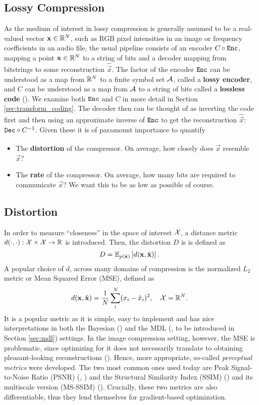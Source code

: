 \subsection{Lossy Compression}
As the medium of interest in lossy compression is generally assumed to be a
real-valued vector $\vec{x} \in \Reals^N$, such as RGB pixel intensities in an
image or frequency coefficients in an audio file, the usual pipeline consists of 
an encoder $C \circ \Enc$, mapping a point $\vec{x} \in \Reals^N$ to a string of bits and a
decoder mapping from bitstrings to some reconstruction $\hat{\vec{x}}$. The
factor of the encoder $\Enc$  can be understood as a map from $\Reals^N$ to a
finite symbol set $\A$, called a \textbf{lossy encoder}, and $C$ can be
understood as a map from $\A$ to a
string of bits called a \textbf{lossless code} (\cite{goyal2001theoretical}).
We examine both $\Enc$ and $C$ in more detail in Section
\ref{sec:transform_coding}.
The decoder then can be thought of as inverting the code first and then using an
approximate inverse of
$\Enc$ to get the reconstruction $\hat{\vec{x}}$: $\Dec \circ C^{-1}$.
Given these it is of paramount importance to quantify
\begin{itemize}
\item The \textbf{distortion} of the compressor. On average, how closely does
  $\hat{\vec{x}}$ resemble $\vec{x}$?
\item The \textbf{rate} of the compressor. On average, how many bits are
  required to communicate $\vec{x}$? We want this to be as low as possible of course.
\end{itemize}

\subsection{Distortion}
\label{sec:intro_distrotion}
In order to measure ``closeness'' in the space of interest $\ImSpace$,
a distance metric $d(\cdot, \cdot): \ImSpace
\times \ImSpace \rightarrow \Reals$ is introduced. Then, the distortion $D$ is 
is defined as
\[
  D = \Exp{d(\vec{x}, \hat{\vec{x}})}{p(\hat{\vec{x}})}.
\]
A popular choice of $d$, across many domains of compression is the normalized $L_2$ metric
or Mean Squared Error (MSE), defined as
\[
  d(\vec{x}, \hat{\vec{x}}) = \frac{1}{N} \sum_{i}^N (x_i - \hat{x}_i)^2, \quad
  \ImSpace = \Reals^N.
\]
It is a popular metric as it is simple, easy to implement and has nice
interpretations in both the Bayesian (\cite{bishop2013pattern}) and the MDL
(\cite{hinton1993keeping}, to be introduced in Section \ref{sec:mdl}) settings.
In the image compression setting, however, the MSE is problematic, since 
optimizing for it does not necessarily translate to obtaining pleasant-looking
reconstructions (\cite{zhao2015loss}). Hence, more appropriate, so-called
\textit{perceptual metrics} were developed. The two most common ones used today
are Peak Signal-to-Noise Ratio (PSNR) (\cite{psnr}, \cite{gupta2011modified}) and the
Structural Similarity Index (SSIM) (\cite{wang2004image}) and its multiscale
version (MS-SSIM) (\cite{msssim}). Crucially, these two metrics are also
differentiable, thus they lend themselves for gradient-based optimization.

